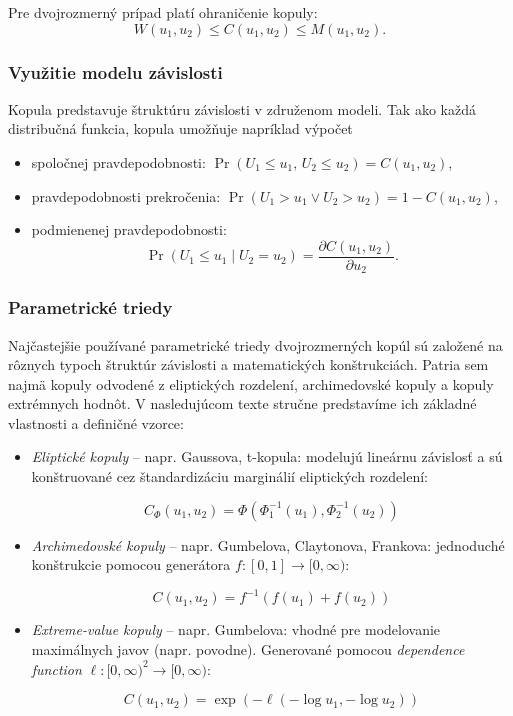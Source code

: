 Pre dvojrozmerný prípad platí ohraničenie kopuly:
\[
W(u_1, u_2) \leq C(u_1, u_2) \leq M(u_1, u_2).
\]

\subsubsection{Využitie modelu závislosti}

Kopula predstavuje štruktúru závislosti v združenom modeli. Tak ako každá distribučná funkcia, kopula umožňuje napríklad výpočet

\begin{itemize}
  \item spoločnej pravdepodobnosti: $\Pr(U_1 \leq u_1,\, U_2 \leq u_2) = C(u_1, u_2)$,
  \item pravdepodobnosti prekročenia: $\Pr(U_1 > u_1 \vee U_2 > u_2) = 1 - C(u_1, u_2)$,
  \item podmienenej pravdepodobnosti:
  \[
  \Pr(U_1 \leq u_1 \mid U_2 = u_2) = \frac{\partial C(u_1, u_2)}{\partial u_2}.
  \]
\end{itemize}

\subsubsection{Parametrické triedy}\label{subsubsec:parametric_copula}

Najčastejšie používané parametrické triedy dvojrozmerných kopúl sú založené na rôznych typoch štruktúr závislosti a matematických konštrukciách. Patria sem najmä kopuly odvodené z eliptických rozdelení, archimedovské kopuly a kopuly extrémnych hodnôt. V nasledujúcom texte stručne predstavíme ich základné vlastnosti a definičné vzorce:

\begin{itemize}
  \item \textit{Eliptické kopuly} – napr. Gaussova, t-kopula: modelujú lineárnu závislosť a sú konštruované cez štandardizáciu marginálií eliptických rozdelení:
  
  \begin{equation}
    C_{\Phi}(u_1, u_2) = \Phi\left( \Phi_1^{-1}(u_1), \Phi_2^{-1}(u_2) \right)
  \end{equation}

  \item \textit{Archimedovské kopuly} – napr. Gumbelova, Claytonova, Frankova: jednoduché konštrukcie pomocou generátora $f:[0,1] \to [0,\infty)$:

  \begin{equation}
  C(u_1, u_2) = f^{-1}\left( f(u_1) + f(u_2) \right)
  \end{equation}

  \item \textit{Extreme-value kopuly} – napr. Gumbelova: vhodné pre modelovanie maximálnych javov (napr. povodne). Generované pomocou \textit{dependence function} $\ell : [0, \infty)^2 \rightarrow [0, \infty)$:

  \begin{equation}
  C(u_1, u_2) = \exp\left(-\ell(-\log u_1, -\log u_2)\right)
  \end{equation}
  
\end{itemize}

